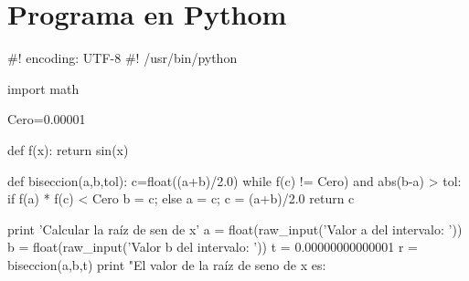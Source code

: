 \section{Programa en Pythom}
#! encoding: UTF-8
#! /usr/bin/python 

import math

Cero=0.00001

def f(x):
 return sin(x)

def biseccion(a,b,tol):
 c=float((a+b)/2.0)
 while f(c) != Cero) and abs(b-a) > tol:
  if f(a) * f(c) < Cero
   b = c;
  else
   a = c;
  c = (a+b)/2.0
 return c

print 'Calcular la raíz de sen de x'
a = float(raw_input('Valor a del intervalo: '))
b = float(raw_input('Valor b del intervalo: '))
t = 0.00000000000001
r = biseccion(a,b,t)
print "El valor de la raíz de seno de x es: %
